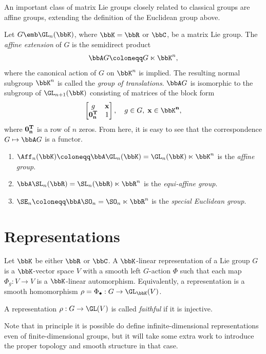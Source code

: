 An important class of matrix Lie groups closely related to classical groups are affine groups, extending the definition of the Euclidean group above.

\begin{defn}
    Let $G\emb \GL_n(\bbK)$, where $\bbK=\bbR$ or $\bbC$, be a matrix Lie group. The \emph{affine extension} of $G$ is the semidirect product 
    \[\bbA G\coloneqq G\ltimes \bbK^n,\]
    where the canonical action of $G$ on $\bbK^n$ is implied. The resulting normal subgroup $\bbK^n$ is called the \emph{group of translations}. $\bbA G$ is isomorphic to the subgroup of $\GL_{n+1}(\bbK)$ consisting of matrices of the block form
    \[\begin{bmatrix}
        g & \bf{x}\\
        \bf{0}_n^T & 1
    \end{bmatrix},\quad g\in G,\; \bf{x}\in\bbK^n,\]
    where $\bf{0}_n^T$ is a row of $n$ zeros. From here, it is easy to see that the correspondence $G\mapsto \bbA G$ is a functor.
\end{defn}

\begin{example}
    \begin{enumerate}
        \item $\Aff_n(\bbK)\coloneqq \bbA \GL_n(\bbK)=\GL_n(\bbK)\ltimes\bbK^n$ is the \emph{affine group}.
        \item $\bbA \SL_n(\bbR)=\SL_n(\bbR)\ltimes \bbR^n$ is the \emph{equi-affine group}.
        \item $\SE_n\coloneqq \bbA \SO_n{}= \SO_n\ltimes\bbR^n$ is the \emph{special Euclidean group}.
    \end{enumerate}
\end{example}










\section{Representations}

\begin{defn}
    Let $\bbK$ be either $\bbR$ or $\bbC$. A $\bbK$-linear representation of a Lie group $G$ is a $\bbK$-vector space $V$ with a smooth left $G$-action $\Phi$ such that each map $\Phi_g:V\to V$ is a $\bbK$-linear automorphism. Equivalently, a representation is a smooth homomorphism $\rho=\Phi_\bullet:G\to \GL_{\bbK}(V)$. 

    A representation $\rho :G\to \GL(V)$ is called \emph{faithful} if it is injective.
\end{defn}
Note that in principle it is possible do define infinite-dimensional representations even of finite-dimensional groups, but it will take some extra work to introduce the proper topology and smooth structure in that case.

